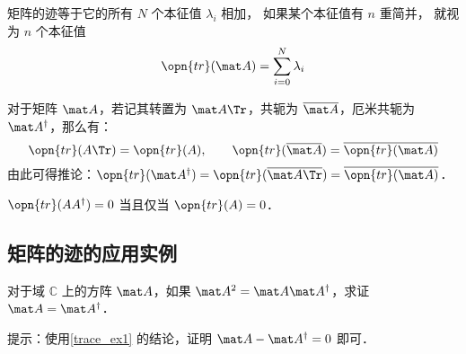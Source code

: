\begin{theorem}{}
矩阵的迹等于它的所有 $N$ 个本征值 $\lambda_i$ 相加， 如果某个本征值有 $n$ 重简并， 就视为 $n$ 个本征值
\begin{equation}
\opn{tr}(\mat A) = \sum_{i=0}^N \lambda_i
\end{equation}
\end{theorem}


\begin{exercise}{}\label{trace_exe1}
对于矩阵 $\mat A$，若记其转置为 $\mat A\Tr$，共轭为 $\overline{\mat A}$，厄米共轭为 $\mat A^\dagger$，那么有：
\begin{equation}
\opn{tr}(A\Tr)=\opn{tr}(A), \qquad \opn{tr}(\overline{\mat A})=\overline{\opn{tr}(\mat A)}
\end{equation}
由此可得推论：$\opn{tr}(\mat A^\dagger)=\opn{tr}(\overline{\mat A\Tr})=\overline{\opn{tr}(\mat A)}$．
\end{exercise}

\begin{example}{}\label{trace_ex1}
$\opn{tr}(AA^\dagger)=0$ 当且仅当 $\opn{tr}(A)=0$．
\end{example}

\subsection{矩阵的迹的应用实例}

\begin{exercise}{}
对于域 $\mathbb{C}$ 上的方阵 $\mat A$，如果 $\mat A^2=\mat A\mat A^\dagger$，求证 $\mat A=\mat A^\dagger$．

提示：使用\autoref{trace_ex1} 的结论，证明 $\mat A-\mat A^\dagger=0$ 即可．
\end{exercise}
